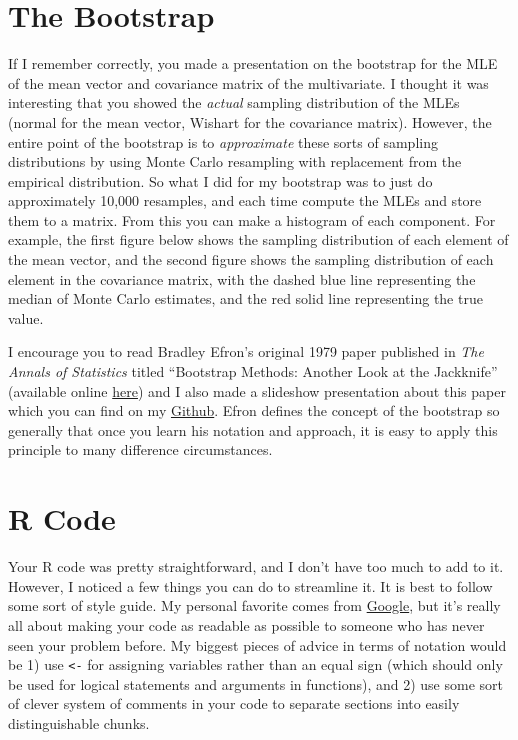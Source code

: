 \documentclass[11pt]{article}
\begin{document}
\section{The Bootstrap}

If I remember correctly, you made a presentation on the bootstrap for the MLE of the mean vector and covariance matrix of the multivariate. I thought it was interesting that you showed the \emph{actual} sampling distribution of the MLEs (normal for the mean vector, Wishart for the covariance matrix). However, the entire point of the bootstrap is to \emph{approximate} these sorts of sampling distributions by using Monte Carlo resampling with replacement from the empirical distribution. So what I did for my bootstrap was to just do approximately 10,000 resamples, and each time compute the MLEs and store them to a matrix. From this you can make a histogram of each component. For example, the first figure below shows the sampling distribution of each element of the mean vector, and the second figure shows the sampling distribution of each element in the covariance matrix, with the dashed blue line representing the median of Monte Carlo estimates, and the red solid line representing the true value. 

\pagebreak

I encourage you to read Bradley Efron's original 1979 paper published in \emph{The Annals of Statistics} titled ``Bootstrap Methods: Another Look at the Jackknife'' (available online \href{http://www.stat.cmu.edu/~fienberg/Statistics36-756/Efron1979.pdf}{here}) and I also made a slideshow presentation about this paper which you can find on my \href{https://github.com/spencerwoody/SDS190/blob/master/Spencer_slideshow.pdf}{Github}. Efron defines the concept of the bootstrap so generally that once you learn his notation and approach, it is easy to apply this principle to many difference circumstances. 

\section{\textsf{R} Code}

Your \textsf{R} code was pretty straightforward, and I don't have too much to add to it. However, I noticed a few things you can do to streamline it. It is best to follow some sort of style guide. My personal favorite comes from \href{https://google.github.io/styleguide/Rguide.xml}{Google}, but it's really all about making your code as readable as possible to someone who has never seen your problem before. My biggest pieces of advice in terms of notation would be 1) use \texttt{<-} for assigning variables rather than an equal sign (which should only be used for logical statements and arguments in functions), and 2) use some sort of clever system of comments in your code to separate sections into easily distinguishable chunks.
\end{document}
